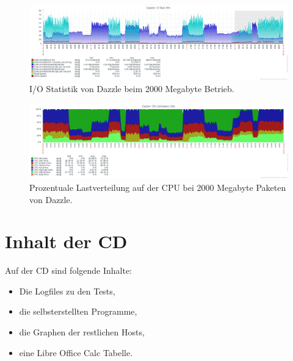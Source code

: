 \begin{figure}[htbp]
\centering
\includegraphics*[width=0.9\linewidth]{Abb/ZabbixDazzle/Standard/IoStatStandard2000}

\caption{I/O Statistik von Dazzle beim 2000 Megabyte Betrieb.}
\label{fig:IoStatDazzleStandard2000}
\end{figure} %

\begin{figure}[htbp]
\centering
\includegraphics*[width=0.9\linewidth]{Abb/ZabbixDazzle/Standard/CPUStandard2000}

\caption{Prozentuale Lastverteilung auf der CPU bei 2000 Megabyte Paketen von Dazzle.}
\label{fig:CPUDazzleStandard2000}
\end{figure}

\section{Inhalt der CD}
Auf der CD sind folgende Inhalte:
\begin{itemize}
\item Die Logfiles zu den Tests, 
\item die selbsterstellten Programme,
\item die Graphen der restlichen Hosts,
\item eine Libre Office Calc Tabelle.
\end{itemize}



















